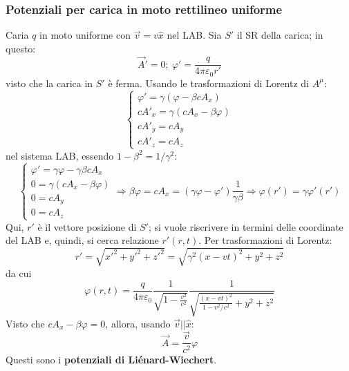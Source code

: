 \documentclass[10pt, a4paper]{scrartcl}
\numberwithin{equation}{subsection}
\theoremstyle{style1}
\begin{document}
\subsubsection{Potenziali per carica in moto rettilineo uniforme}\label{pcmru}

Caria $q$ in moto uniforme con $\vec{v}=v \hat{x}$ nel LAB. Sia $S'$ il SR della carica; in questo:
\begin{equation}
		\vec{A}' = 0; \ \varphi ' = \frac{q}{4 \pi \varepsilon _0 r'} 
\end{equation}
visto che la carica in $S'$ \`e ferma. Usando le trasformazioni di Lorentz di $A^\mu $:
\begin{equation}
	\begin{cases}
		\varphi ' = \gamma(\varphi  - \beta cA_x)\\
		cA'_x = \gamma(cA_x - \beta \varphi ) \\
		cA'_y = cA_y \\
		cA'_z = cA_z
	\end{cases}
\end{equation}
nel sistema LAB, essendo $1-\beta ^2 = 1 / \gamma^2$:
\begin{equation}
	\begin{cases}
	\varphi ' = \gamma\varphi  - \gamma \beta c A_x \\
	0 = \gamma(cA_x - \beta \varphi )\\
	0 = cA_y \\
	0 = cA_z
\end{cases} \Rightarrow \beta \varphi = cA_x = (\gamma\varphi  - \varphi ') \frac{1}{\gamma\beta }\Rightarrow \varphi(r')  = \gamma\varphi '(r')
\end{equation}
Qui, $r'$ \`e il vettore posizione di $S'$; si vuole riscrivere in termini delle coordinate del LAB e, quindi, si cerca relazione $r'(r,t)$. Per trasformazioni di Lorentz:
\[
r' = \sqrt{x'^2 + y'^2 + z'^2} = \sqrt{\gamma^2 (x-vt) ^2 + y^2 + z^2} 
\] 
da cui
\begin{equation}
	\varphi (r,t) = \frac{q}{4\pi \varepsilon _0} \frac{1}{\sqrt{1- \frac{v^2}{c^2}} } \frac{1}{\sqrt{\frac{(x-vt)^2}{1-v^2 / c^2} + y^2 + z^2} }
\end{equation}
Visto che $cA_x - \beta \varphi  = 0$, allora, usando $\vec{v} | | \hat{x}$:
\begin{equation}
	\vec{A}= \frac{\vec{v}}{c^2} \varphi 
\end{equation}
Questi sono i \textbf{potenziali di Li\'enard-Wiechert}.
\end{document}
